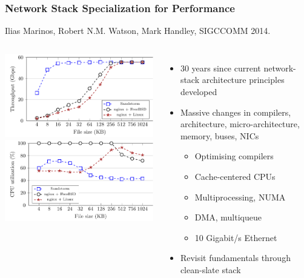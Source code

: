 \begin{frame}
  \frametitle{Network Stack Specialization for Performance}

  Ilias Marinos, Robert N.M. Watson, Mark Handley, SIGCCOMM 2014.

  \smallskip

  \begin{columns}[T]

    \smallskip
    \includegraphics[scale=0.61]{../../figures/throughput_nginx_sandstorm_6nics_new.pdf} \\
    \includegraphics[scale=0.61]{../../figures/cpu_nginx_sandstorm_6nics_new.pdf}

    \begin{itemize}
      \item 30 years since current network-stack architecture principles
	developed
      \item Massive changes in compilers, architecture, micro-architecture,
	memory, buses, NICs
      \begin{itemize}
	\item Optimising compilers
	\item Cache-centered CPUs
	\item Multiprocessing, NUMA
	\item DMA, multiqueue
	\item 10 Gigabit/s Ethernet
      \end{itemize}
      \item Revisit fundamentals through clean-slate stack
    \end{itemize}
  \end{columns}
\end{frame}

